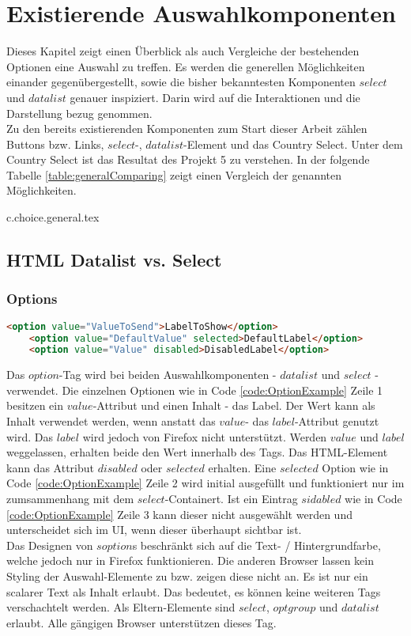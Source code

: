 \chapter{Existierende Auswahlkomponenten}

Dieses Kapitel zeigt einen Überblick als auch Vergleiche der bestehenden Optionen eine Auswahl zu treffen. 
Es werden die generellen Möglichkeiten einander gegenübergestellt, sowie die bisher bekanntesten Komponenten $select$ und $datalist$ genauer inspiziert.
Darin wird auf die Interaktionen und die Darstellung bezug genommen. 
\\
Zu den bereits existierenden Komponenten zum Start dieser Arbeit zählen Buttons bzw. Links, $select$-, $datalist$-Element und das Country Select.
Unter dem Country Select ist das Resultat des Projekt 5 zu verstehen.
In der folgende Tabelle \ref{table:generalComparing} zeigt einen Vergleich der genannten Möglichkeiten.

{c.choice.general.tex}

\section{HTML Datalist vs. Select}

\subsection{Options}

\begin{lstlisting}[language = html, caption = Code: Option Example, label = code:OptionExample]
    <option value="ValueToSend">LabelToShow</option>
    <option value="DefaultValue" selected>DefaultLabel</option>
    <option value="Value" disabled>DisabledLabel</option>
\end{lstlisting}

Das $option$-Tag wird bei beiden Auswahlkomponenten - $datalist$ und $select$ - verwendet. 
Die einzelnen Optionen wie in Code \ref{code:OptionExample} Zeile 1 besitzen ein $value$-Attribut und einen Inhalt - das Label.
Der Wert kann als Inhalt verwendet werden, wenn anstatt das $value$- das $label$-Attribut genutzt wird.
Das $label$ wird jedoch von Firefox nicht unterstützt.
Werden $value$ und $label$ weggelassen, erhalten beide den Wert innerhalb des Tags.
Das HTML-Element kann das Attribut $disabled$ oder $selected$ erhalten.
Eine $selected$ Option wie in Code \ref{code:OptionExample} Zeile 2 wird initial ausgefüllt und funktioniert nur im zumsammenhang mit dem $select$-Containert. 
Ist ein Eintrag $sidabled$ wie in Code \ref{code:OptionExample} Zeile 3 kann dieser nicht ausgewählt werden und unterscheidet sich im UI, wenn dieser überhaupt sichtbar ist.
\\
Das Designen von $soption$s beschränkt sich auf die Text- / Hintergrundfarbe, welche jedoch nur in Firefox funktionieren. 
Die anderen Browser lassen kein Styling der Auswahl-Elemente zu bzw. zeigen diese nicht an.
Es ist nur ein scalarer Text als Inhalt erlaubt. 
Das bedeutet, es können keine weiteren Tags verschachtelt werden.
Als Eltern-Elemente sind $select$, $optgroup$ und $datalist$ erlaubt.
Alle gängigen Browser unterstützen dieses Tag.



